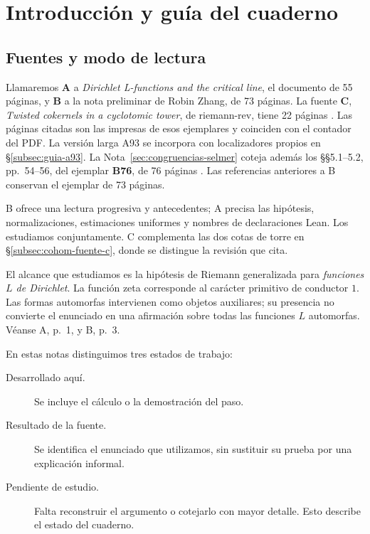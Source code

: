 \section{Introducción y guía del cuaderno}
\label{sec:guia}


\clearpage

\subsection{Fuentes y modo de lectura}

Llamaremos \textbf{A} a \emph{Dirichlet L-functions and the critical line},
el documento de 55 páginas, y \textbf{B} a la nota preliminar de Robin Zhang,
de 73 páginas. La fuente \textbf{C}, \emph{Twisted cokernels in a cyclotomic
tower}, de riemann-rev, tiene 22 páginas \cite{fuenteA,fuenteB,fuenteC}.
Las páginas citadas son las impresas de esos ejemplares y coinciden
con el contador del PDF. La versión larga A93 se incorpora con
localizadores propios en §\ref{subsec:guia-a93}.
La Nota~\ref{sec:congruencias-selmer} coteja además los §§5.1--5.2,
pp.~54--56, del ejemplar \textbf{B76}, de 76 páginas
\cite{fuenteB76}. Las referencias anteriores a B conservan
el ejemplar de 73 páginas.

B ofrece una lectura progresiva y antecedentes; A precisa las hipótesis,
normalizaciones, estimaciones uniformes y nombres de declaraciones Lean.
Los estudiamos conjuntamente. C complementa las dos cotas de torre
en §\ref{subsec:cohom-fuente-c}, donde se distingue la revisión que cita.

El alcance que estudiamos es la hipótesis de Riemann generalizada para
\emph{funciones $L$ de Dirichlet}. La función zeta corresponde al carácter
primitivo de conductor $1$. Las formas automorfas intervienen como objetos
auxiliares; su presencia no convierte el enunciado en una afirmación sobre
todas las funciones $L$ automorfas. Véanse A, p.~1, y B, p.~3.

En estas notas distinguimos tres estados de trabajo:
\begin{description}
  \item[Desarrollado aquí.] Se incluye el cálculo o la demostración del paso.
  \item[Resultado de la fuente.] Se identifica el enunciado que utilizamos,
    sin sustituir su prueba por una explicación informal.
  \item[Pendiente de estudio.] Falta reconstruir el argumento o cotejarlo
    con mayor detalle. Esto describe el estado del cuaderno.
\end{description}

